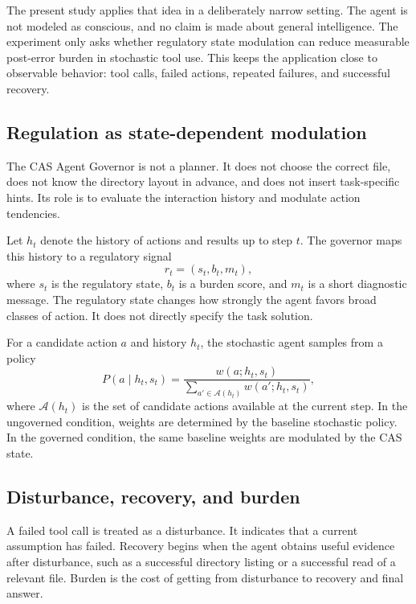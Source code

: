 \documentclass[11pt]{article}
\begin{document}
The present study applies that idea in a deliberately narrow setting. The agent is not modeled as conscious, and no claim is made about general intelligence. The experiment only asks whether regulatory state modulation can reduce measurable post-error burden in stochastic tool use. This keeps the application close to observable behavior: tool calls, failed actions, repeated failures, and successful recovery.

\subsection{Regulation as state-dependent modulation}

The CAS Agent Governor is not a planner. It does not choose the correct file, does not know the directory layout in advance, and does not insert task-specific hints. Its role is to evaluate the interaction history and modulate action tendencies.

Let $h_t$ denote the history of actions and results up to step $t$. The governor maps this history to a regulatory signal
\begin{equation}
    r_t = (s_t, b_t, m_t),
\end{equation}
where $s_t$ is the regulatory state, $b_t$ is a burden score, and $m_t$ is a short diagnostic message. The regulatory state changes how strongly the agent favors broad classes of action. It does not directly specify the task solution.

For a candidate action $a$ and history $h_t$, the stochastic agent samples from a policy
\begin{equation}
    P(a \mid h_t, s_t) = \frac{w(a; h_t, s_t)}{\sum_{a' \in \mathcal{A}(h_t)} w(a'; h_t, s_t)},
\end{equation}
where $\mathcal{A}(h_t)$ is the set of candidate actions available at the current step. In the ungoverned condition, weights are determined by the baseline stochastic policy. In the governed condition, the same baseline weights are modulated by the CAS state.

\subsection{Disturbance, recovery, and burden}

A failed tool call is treated as a disturbance. It indicates that a current assumption has failed. Recovery begins when the agent obtains useful evidence after disturbance, such as a successful directory listing or a successful read of a relevant file. Burden is the cost of getting from disturbance to recovery and final answer.
\end{document}
